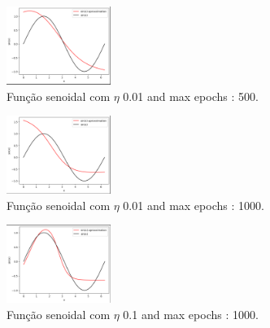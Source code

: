 \documentclass{article}
\begin{document}
\vspace{10pt}

\begin{figure}[h]

    \centering
    \includegraphics[height=1in]{sin_ap3.png}
    \caption{Função senoidal com $\eta$ 0.01 and max epochs : 500.}
    \label{fig:example}
    
\end{figure}

\vspace{10pt}


\vspace{10pt}

\begin{figure}[h]

    \centering
    \includegraphics[height=1in]{sin_ap4.png}
    \caption{Função senoidal com $\eta$ 0.01 and max epochs : 1000.}
    \label{fig:example}
    
\end{figure}

\vspace{10pt}

\vspace{10pt}

\begin{figure}[h]

    \centering
    \includegraphics[height=1in]{sin_ap5.png}
    \caption{Função senoidal com $\eta$ 0.1 and max epochs : 1000.}
    \label{fig:example}
    
\end{figure}

\vspace{10pt}
\end{document}
